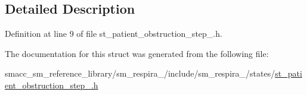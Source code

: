\subsection{Detailed Description}


Definition at line 9 of file st\+\_\+patient\+\_\+obstruction\+\_\+step\+\_.\+h.



The documentation for this struct was generated from the following file\+:\begin{DoxyCompactItemize}
\item 
smacc\+\_\+sm\+\_\+reference\+\_\+library/sm\+\_\+respira\+\_/include/sm\+\_\+respira\+\_/states/\hyperlink{st__patient__obstruction__step__1_8h}{st\+\_\+patient\+\_\+obstruction\+\_\+step\+\_.\+h}\end{DoxyCompactItemize}
